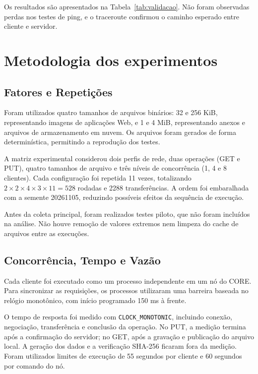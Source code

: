 \documentclass[12pt]{article}
\begin{document}
Os resultados são apresentados na Tabela~\ref{tab:validacao}. Não foram observadas perdas nos testes de ping, e o traceroute confirmou o caminho esperado entre cliente e servidor.




\section{Metodologia dos experimentos}
\label{sec:metodologia}

\subsection{Fatores e Repetições}

Foram utilizados quatro tamanhos de arquivos binários: 32 e 256 KiB, representando imagens de aplicações Web, e 1 e 4 MiB, representando anexos e arquivos de armazenamento em nuvem. Os arquivos foram gerados de forma determinística, permitindo a reprodução dos testes.

A matriz experimental considerou dois perfis de rede, duas operações (GET e PUT), quatro tamanhos de arquivo e três níveis de concorrência (1, 4 e 8 clientes). Cada configuração foi repetida 11 vezes, totalizando $2 \times 2 \times 4 \times 3 \times 11 = 528$ rodadas e 2288 transferências. A ordem foi embaralhada com a semente 20261105, reduzindo possíveis efeitos da sequência de execução.

Antes da coleta principal, foram realizados testes piloto, que não foram incluídos na análise. Não houve remoção de valores extremos nem limpeza do cache de arquivos entre as execuções.

\subsection{Concorrência, Tempo e Vazão}

Cada cliente foi executado como um processo independente em um nó do CORE. Para sincronizar as requisições, os processos utilizaram uma barreira baseada no relógio monotônico, com início programado 150 ms à frente.

O tempo de resposta foi medido com \texttt{CLOCK\_MONOTONIC}, incluindo conexão, negociação, transferência e conclusão da operação. No PUT, a medição termina após a confirmação do servidor; no GET, após a gravação e publicação do arquivo local. A geração dos dados e a verificação SHA-256 ficaram fora da medição. Foram utilizados limites de execução de 55 segundos por cliente e 60 segundos por comando do nó.
\end{document}
